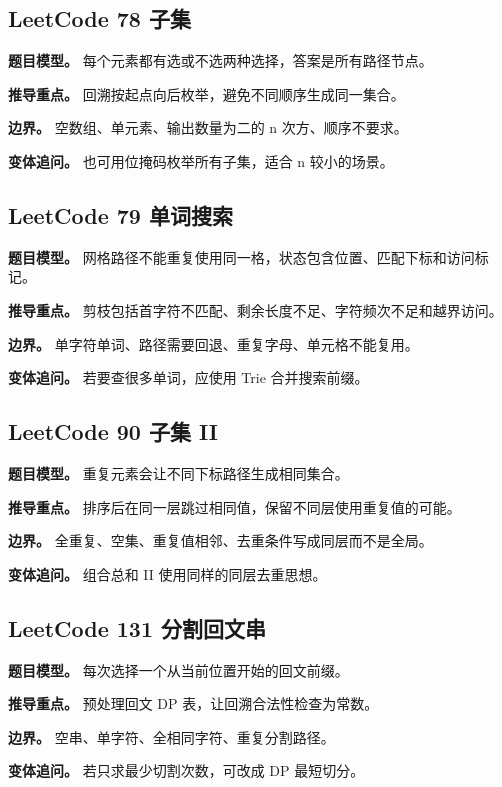 \subsection{LeetCode 78 子集}

\textbf{题目模型。} 每个元素都有选或不选两种选择，答案是所有路径节点。

\textbf{推导重点。} 回溯按起点向后枚举，避免不同顺序生成同一集合。

\textbf{边界。} 空数组、单元素、输出数量为二的 n 次方、顺序不要求。

\textbf{变体追问。} 也可用位掩码枚举所有子集，适合 n 较小的场景。

\subsection{LeetCode 79 单词搜索}

\textbf{题目模型。} 网格路径不能重复使用同一格，状态包含位置、匹配下标和访问标记。

\textbf{推导重点。} 剪枝包括首字符不匹配、剩余长度不足、字符频次不足和越界访问。

\textbf{边界。} 单字符单词、路径需要回退、重复字母、单元格不能复用。

\textbf{变体追问。} 若要查很多单词，应使用 Trie 合并搜索前缀。

\subsection{LeetCode 90 子集 II}

\textbf{题目模型。} 重复元素会让不同下标路径生成相同集合。

\textbf{推导重点。} 排序后在同一层跳过相同值，保留不同层使用重复值的可能。

\textbf{边界。} 全重复、空集、重复值相邻、去重条件写成同层而不是全局。

\textbf{变体追问。} 组合总和 II 使用同样的同层去重思想。

\subsection{LeetCode 131 分割回文串}

\textbf{题目模型。} 每次选择一个从当前位置开始的回文前缀。

\textbf{推导重点。} 预处理回文 DP 表，让回溯合法性检查为常数。

\textbf{边界。} 空串、单字符、全相同字符、重复分割路径。

\textbf{变体追问。} 若只求最少切割次数，可改成 DP 最短切分。

